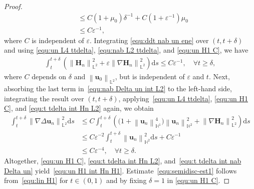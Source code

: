\documentclass[11pt, reqno]{amsart}
\theoremstyle{definition}
\numberwithin{equation}{section}
\newcommand{\bff}{\boldsymbol}
\newcommand{\bb}{\mathbb}
\newcommand{\ds}{\mathrm{d}s}
\newcommand{\norm}[2]{\left\|{#1}\right\|_{#2}}
\begin{document}
\begin{proof}
\begin{align}
        &\leq 
        C(1+\mu_0)\delta^{-1}+ C(1+\varepsilon^{-1})\mu_0
        \nonumber\\
        &\leq
        C\varepsilon^{-1},
	\end{align}
	where $C$ is independent of $\varepsilon$.
    Integrating \eqref{equ:ddt nab un ene} over $(t,t+\delta)$ and using \eqref{equ:un L4 ttdelta}, \eqref{equ:nab L2 ttdelta}, and \eqref{equ:un H1 C}, we have
	\begin{align}\label{equ:t tdelta int Hn L2}
		\int_t^{t+\delta} \left(\norm{\bff{H}_n}{\bb{L}^2}^2
		+
		\varepsilon \norm{\nabla \bff{H}_n}{\bb{L}^2}^2\right) \ds
		\leq 
		C\varepsilon^{-1}, 
		\quad
		\forall t\geq \delta,
	\end{align}
    where $C$ depends on $\delta$ and $\norm{\bff{u}_0}{\bb{L}^2}$, but is independent of $\varepsilon$ and $t$.
	Next, absorbing the last term in~\eqref{equ:nab Delta un int L2} to the left-hand side, integrating the result over $(t,t+\delta)$, applying~\eqref{equ:un L4 ttdelta}, \eqref{equ:un H1 C}, and \eqref{equ:t tdelta int Hn L2} again, we obtain
	\begin{align}\label{equ:t tdelta int nab Delta un}
		\int_t^{t+\delta} \norm{\nabla \Delta \bff{u}_n}{\bb{L}^2}^2 \ds
		&\leq
        C \int_t^{t+\delta} \left(\big(1+\norm{\bff{u}_n}{\bb{H}^1}^4\big) \norm{\bff{u}_n}{\bb{H}^2}^2 + \norm{\nabla \bff{H}_n}{\bb{L}^2}^2 \right) \ds
        \nonumber\\
        &\leq 
        C\varepsilon^{-2} 
        \int_t^{t+\delta} \norm{\bff{u}_n}{\bb{H}^2}^2 \ds 
        +
        C\varepsilon^{-1}
        \nonumber\\
		&\leq
        C\varepsilon^{-4},
		\quad 
		\forall t\geq \delta.
	\end{align}
    Altogether, \eqref{equ:un H1 C}, \eqref{equ:t tdelta int Hn L2}, and~\eqref{equ:t tdelta int nab Delta un} yield~\eqref{equ:un H1 int Hn H1}. Estimate~\eqref{equ:semidisc-est1} follows from~\eqref{equ:lin H1} for $t\in (0,1)$ and by fixing $\delta=1$ in \eqref{equ:un H1 C}.
    

\end{proof}
\end{document}

